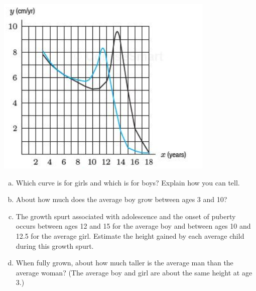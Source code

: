 \begin{enumerate}[1.]
\begin{multicols}{2}
\begin{Question}
\includegraphics[width=0.8\linewidth]{graphics/Week04_DefiniteIntegralsInModeling/HeightVelocity}
\begin{enumerate}[(a)]
\item Which curve is for girls and which is for boys?  Explain how
  you can tell.
\item About how much does the average boy grow between ages 3 and
    10?
  \item The growth spurt associated with adolescence and the onset of
    puberty occurs between ages 12 and 15 for the average boy and
    between ages 10 and 12.5 for the average girl. Estimate the height
    gained by each average child during this growth spurt.
  \item When fully grown, about how much taller is the average man
    than the average woman? (The average boy and girl are about the
    same height at age 3.)
\end{enumerate}

  \end{Question}


\end{multicols}
\end{enumerate}
